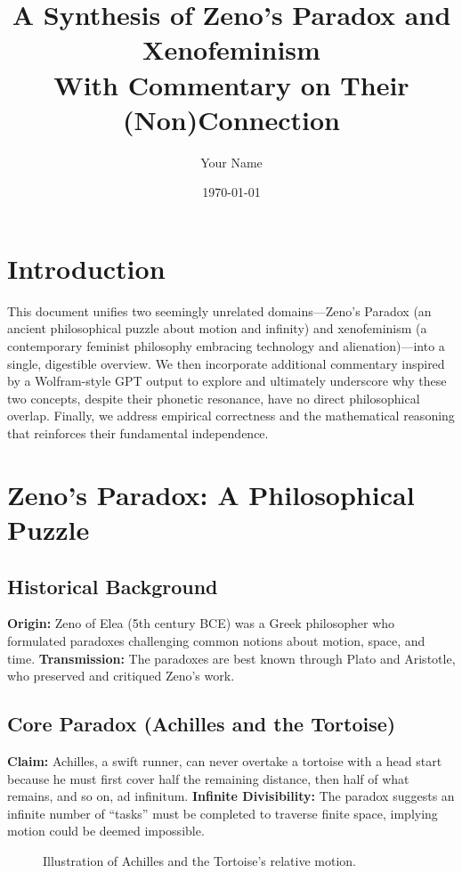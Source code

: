 \documentclass[12pt]{article}
\title{\textbf{A Synthesis of Zeno’s Paradox and Xenofeminism \\ 
\large With Commentary on Their (Non)Connection}}
\author{Your Name}
\date{\today}
\begin{document}
\maketitle
\tableofcontents
\newpage

\section{Introduction}

This document unifies two seemingly unrelated domains---Zeno’s Paradox (an ancient philosophical puzzle about motion and infinity) and xenofeminism (a contemporary feminist philosophy embracing technology and alienation)---into a single, digestible overview. We then incorporate additional commentary inspired by a Wolfram-style GPT output to explore and ultimately underscore why these two concepts, despite their phonetic resonance, have no direct philosophical overlap. Finally, we address empirical correctness and the mathematical reasoning that reinforces their fundamental independence.

\section{Zeno’s Paradox: A Philosophical Puzzle}

\subsection{Historical Background}

\textbf{Origin:} Zeno of Elea (5th century BCE) was a Greek philosopher who formulated paradoxes challenging common notions about motion, space, and time.  
\textbf{Transmission:} The paradoxes are best known through Plato and Aristotle, who preserved and critiqued Zeno’s work.

\subsection{Core Paradox (Achilles and the Tortoise)}

\textbf{Claim:} Achilles, a swift runner, can never overtake a tortoise with a head start because he must first cover half the remaining distance, then half of what remains, and so on, ad infinitum.  
\textbf{Infinite Divisibility:} The paradox suggests an infinite number of ``tasks'' must be completed to traverse finite space, implying motion could be deemed impossible.

\begin{figure}[h!]
    \centering
    \caption{Illustration of Achilles and the Tortoise's relative motion.}
    \label{fig:zeno-paradox}
\end{figure}
\end{document}
